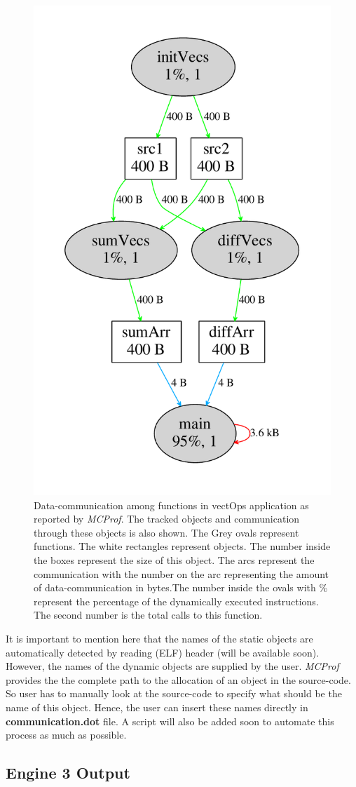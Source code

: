 \documentclass[11pt]{article}
\newcommand{\MCPROF}{\emph{MCProf}}
\begin{document}
\begin{figure}[!h]
\centering
\includegraphics[width=0.55\linewidth]{figures/commWithObjects.pdf}
\caption{Data-communication among functions in vectOps application as reported
    by \MCPROF{}. The tracked objects and communication through these objects
    is also shown. The Grey ovals represent functions. The white rectangles
    represent objects. The number inside the boxes represent the size of this
    object. The arcs represent the communication with the number on
    the arc representing the amount of data-communication in bytes.The number
    inside the ovals with \% represent the percentage of the dynamically
    executed instructions. The second number is the total calls to this function.}
\label{fig:commWithObjects}
\end{figure}

It is important to mention here that the names of the static objects are automatically
detected by reading (ELF) header (will be available soon). However, the names of the
dynamic objects are supplied by the user. \MCPROF{} provides the the complete path
to the allocation of an object in the source-code. So user has to manually look at
the source-code to specify what should be the name of this object. Hence, the user
can insert these names directly in \textbf{communication.dot} file. A script will also be
added soon to automate this process as much as possible.

\subsection{Engine 3 Output}
\end{document}
